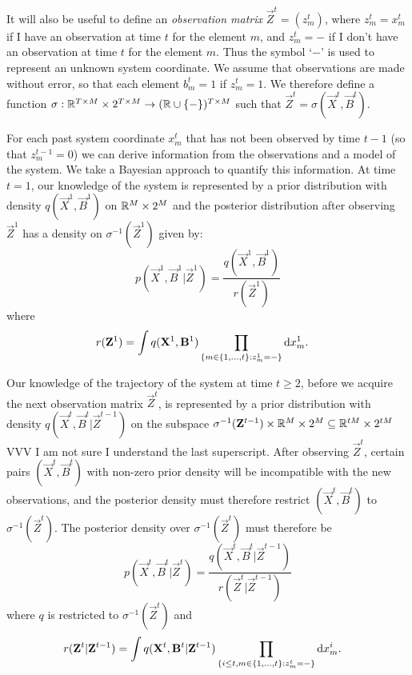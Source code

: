 It will also be useful to define an {\em observation matrix} $\vec{Z}^t = (z^t_m)$, where $z^t_m = x^t_m$ if I have an observation at time $t$ for the element $m$, and $z^t_m = -$ if I don't have an observation at time $t$ for the element $m$. Thus the symbol `$-$' is used to represent an unknown system coordinate. We assume that observations are made without error, so that each element $b^t_m = 1$ if $z^t_m = 1$. We therefore define a function $\sigma: \mathbb R^{T \times M} \times 2^{T \times M} \rightarrow (\mathbb R \cup \{ - \})^{T \times M}$ such that $\vec{Z}^t = \sigma(\vec{X}^t, \vec{B}^t)$.

For each past system coordinate $x^{t}_m$ that has not been observed by time $t-1$ (so that $z^{t-1}_m = 0$) we can derive information from the observations and a model of the system. We take a Bayesian approach to quantify this information. At time $t=1$, our knowledge of the system is represented by a prior distribution with density $q(\vec{X}^1, \vec{B}^1)$ on $\mathbb R^M \times 2^M$ and the posterior distribution after observing $\vec{Z}^1$ has a density on $\sigma^{-1}(\vec{Z}^1)$ given by:
\begin{equation*}
    p(\vec{X}^1, \vec{B}^1 |\vec{Z}^1) =
        \frac{q(\vec{X}^1, \vec{B}^1)}
        {r(\vec{Z}^1)} 
\end{equation*}
where
\begin{align*}
    r(\mathbf{Z}^1)  &= \int q(\mathbf{X}^1, \mathbf{B}^1) \prod_{ \{m \in \{1, \ldots, t \} : z^1_m = - \} } \mathrm{d} x^1_m.
\end{align*}

Our knowledge of the trajectory of the system at time $t \geq 2$, before we acquire the next observation matrix $\vec{Z}^t$, is represented by a prior distribution with density $q(\vec{X}^t, \vec{B}^t | \vec{Z}^{t-1})$ on the subspace {\color{red}$\sigma^{-1}(\mathbf{Z}^{t-1}) \times \mathbb R^M \times 2^M \subseteq \mathbb R^{tM} \times 2^{tM}$ VVV I am not sure I understand the last superscript}. After observing $\vec{Z}^t$, certain pairs $(\vec{X}^t, \vec{B}^t)$ with non-zero prior density will be incompatible with the new observations, and the posterior density must therefore restrict $(\vec{X}^t, \vec{B}^t)$ to $\sigma^{-1}(\vec{Z}^t)$. The posterior density over $\sigma^{-1}(\vec{Z}^t)$ must therefore be
\begin{equation*}
    p(\vec{X}^t, \vec{B}^t |\vec{Z}^t) =
        \frac{q(\vec{X}^t, \vec{B}^t | \vec{Z}^{t-1})}
        {r(\vec{Z}^t | \vec{Z}^{t-1})} 
\end{equation*}
where $q$ is restricted to $\sigma^{-1}(\vec{Z}^t)$ and
\begin{align*}
    r(\mathbf{Z}^t | \mathbf{Z}^{t-1})  &= \int q(\mathbf{X}^t, \mathbf{B}^t | \mathbf{Z}^{t-1}) \prod_{ \{ i \leq t, m \in \{1, \ldots, t \} : z^t_m = - \} } \mathrm{d} x^i_m.
\end{align*}

